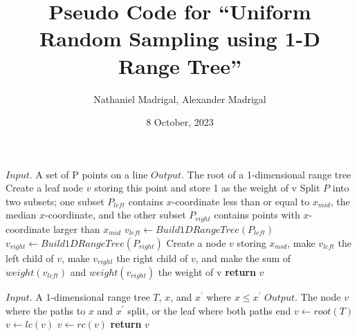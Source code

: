 \documentclass{article}
\title{Pseudo Code for ``Uniform Random Sampling using 1-D Range Tree''}
\author{Nathaniel Madrigal, Alexander Madrigal}
\date{8 October, 2023}
\begin{document}
\maketitle

\begin{algorithm}
\caption{$Build1DRangeTree(P)$}
\begin{algorithmic}[1]
    \Statex $Input.$ A set of P points on a line
    \Statex $Output.$ The root of a 1-dimensional range tree
        \State Create a leaf node $v$ storing this point and store 1 as the weight of v
    \Else 
        \State Split $P$ into two subsets; one subset $P_{left}$ contains $x$-coordinate less \Statex \hspace{11.5 pt} than or equal to $x_{mid}$, the median $x$-coordinate, and the other subset \Statex \hspace{11.5 pt} $P_{right}$ contains points with $x$-coordinate larger than $x_{mid}$
        \State $v_{left} \gets Build1DRangeTree(P_{left})$
        \State $v_{right} \gets Build1DRangeTree(P_{right})$
        \State Create a node $v$ storing $x_{mid}$, make $v_{left}$ the left child of $v$, make $v_{right}$ \Statex \hspace{11.5 pt} the right child of $v$, and make the sum of $weight(v_{left})$ \Statex \hspace{11.5 pt} and $weight(v_{right})$ the weight of v
    \EndIf
    \State \textbf{return} $v$    
\end{algorithmic}
\end{algorithm}

\begin{algorithm}
\caption{$FindSplitNode(T, x, x^\prime)$}
\begin{algorithmic}[1]
    \Statex $Input.$ A 1-dimensional range tree $T$, $x$, and $x^\prime$ where $x \le x^\prime$
    \Statex $Output.$ The node $v$ where the paths to $x$ and $x^\prime$ split, or the leaf where both paths end
    \State $v \gets root(T)$
        \State $v \gets lc(v)$
        \Else 
        \State $v \gets rc(v)$
        \EndIf
    \EndWhile
    \State \textbf{return} $v$
\end{algorithmic}
\end{algorithm}
\end{document}
